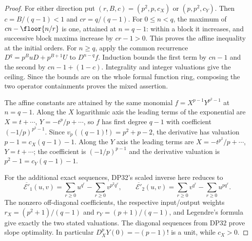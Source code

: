 \begin{proof}
For either direction put $(r,B,c)=(p^2,p,c_X)$ or $(p,p^2,c_Y)$. Then $c=B/(q-1)<1$ and $cr=q/(q-1)$. For $0\le n<q$, the maximum of $cn-\floor{n/r}$ is one, attained at $n=q-1$: within a block it increases, and successive block maxima increase by $cr-1>0$. This proves the affine inequality at the initial orders. For $n\ge q$, apply the common recurrence $D^q=p^BuD+p^{B+1}U$ to $D^{n-q}f$. Induction bounds the first term by $cn-1$ and the second by $cn-1+(1-c)$. Integrality and integer valuations give the ceiling. Since the bounds are on the whole formal function ring, composing the two operator containments proves the mixed assertion.

The affine constants are attained by the same monomial $f=X^{p-1}Y^{p^2-1}$ at $n=q-1$. Along the $X$ logarithmic axis the leading terms of the exponential are $X=t+\cdots$, $Y=-t^p/p+\cdots$, so $f$ has first degree $q-1$ with coefficient $(-1/p)^{p^2-1}$. Since $v_p((q-1)!)=p^2+p-2$, the derivative has valuation $p-1=c_X(q-1)-1$. Along the $Y$ axis the leading terms are $X=-t^{p^2}/p+\cdots$, $Y=t+\cdots$; the coefficient is $(-1/p)^{p-1}$ and the derivative valuation is $p^2-1=c_Y(q-1)-1$.

For the additional exact sequences, DP32's scaled inverse here reduces to
\[
 \overline{\mathcal E'}_1(u,v)=\sum_{r\ge0}u^{q^r}-\sum_{r\ge0}v^{p^2q^r},\qquad
 \overline{\mathcal E'}_2(u,v)=\sum_{r\ge0}v^{q^r}-\sum_{r\ge0}u^{pq^r}.
\]
The nonzero off-diagonal coefficients, the respective input/output weights $r_X=(p^2+1)/(q-1)$ and $r_Y=(p+1)/(q-1)$, and Legendre's formula give exactly the two stated valuations. The diagonal sequences from DP32 prove slope optimality. In particular $D_X^pY(0)=-(p-1)!$ is a unit, while $c_X>0$.
\end{proof}

